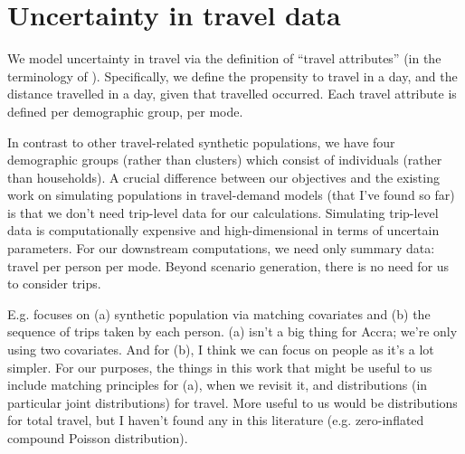 \documentclass{article}
\begin{document}
\begin{appendix}
\begin{landscape}
\end{landscape}


\section{Uncertainty in travel data}

We model uncertainty in travel via the definition of ``travel attributes'' (in the terminology of \citet{Mohammadian2010}). Specifically, we define the propensity to travel in a day, and the distance travelled in a day, given that travelled occurred. Each travel attribute is defined per demographic group, per mode. 

In contrast to other travel-related synthetic populations, we have four demographic groups (rather than clusters) which consist of individuals (rather than households). A crucial difference between our objectives and the existing work on simulating  populations in travel-demand models (that I've found so far) is that we don't need trip-level data for our calculations. Simulating trip-level data is computationally expensive and high-dimensional in terms of uncertain parameters. For our downstream computations, we need only summary data: travel per person per mode. Beyond scenario generation, there is no need for us to consider trips.


E.g. \citet{Saadi2016} focuses on (a) synthetic population via matching covariates and (b) the sequence of trips taken by each person. (a) isn't a big thing for Accra; we're only using two covariates. And for (b), I think we can focus on people as it's a lot simpler. For our purposes, the things in this work that might be useful to us include matching principles for (a), when we revisit it, and distributions (in particular joint distributions) for travel. More useful to us would be distributions for total travel, but I haven't found any in this literature (e.g. zero-inflated compound Poisson distribution).


\end{appendix}
\end{document}

